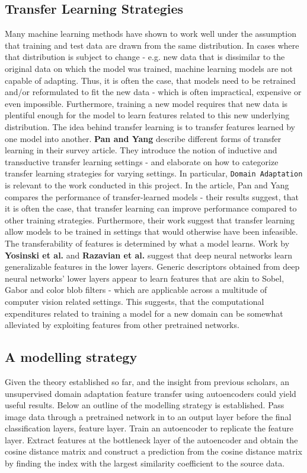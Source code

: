 \subsection{Transfer Learning Strategies}
Many machine learning methods have shown to work well under the assumption that training and test data are drawn from the same distribution. 
In cases where that distribution is subject to change - e.g. new data that is dissimilar to the original data on which the model was trained, machine learning models are not capable of adapting.
Thus, it is often the case, that models need to be retrained and/or reformulated to fit the new data - which is often impractical, expensive or even impossible. 
Furthermore, training a new model requires that new data is plentiful enough for the model to learn features related to this new underlying distribution. 
The idea behind transfer learning is to transfer features learned by one model into another.
\newline
\textbf{Pan and Yang}\autocite{PanYang2010} describe different forms of transfer learning in their survey article. 
They introduce the notion of inductive and transductive transfer learning settings - and elaborate on how to categorize transfer learning strategies for varying settings. 
In particular, \texttt{Domain Adaptation} is relevant to the work conducted in this project. 
In the article, Pan and Yang compares the performance of transfer-learned models - their results suggest, that it is often the case, that transfer learning can improve performance compared to other training strategies. 
Furthermore, their work suggest that transfer learning allow models to be trained in settings that would otherwise have been infeasible. 
\newline
The transferability of features is determined by what a model learns. 
Work by \textbf{Yosinski et al.}\autocite{Yosinski2014} and \textbf{Razavian et al.}\autocite{Razavian2014} suggest that deep neural networks learn generalizable features in the lower layers.
Generic descriptors obtained from deep neural networks' lower layers appear to learn features that are akin to Sobel, Gabor and color blob filters - which are applicable across a multitude of computer vision related settings.
This suggests, that the computational expenditures related to training a model for a new domain can be somewhat alleviated by exploiting features from other pretrained networks. 

\subsection{A modelling strategy}
Given the theory established so far, and the insight from previous scholars, an unsupervised domain adaptation feature transfer using autoencoders could yield useful results.
Below an outline of the modelling strategy is established.
Pass image data through a pretrained network in to an output layer before the final classification layers, feature layer. 
Train an autoencoder to replicate the feature layer. 
Extract features at the bottleneck layer of the autoencoder and obtain the cosine distance matrix and construct a prediction from the cosine distance matrix by finding the index with the largest similarity coefficient to the source data.

